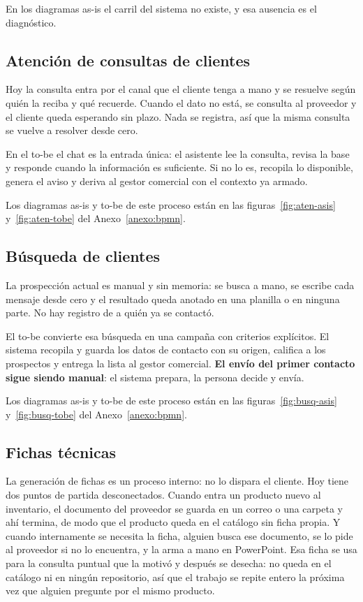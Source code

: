 \documentclass{article}
\begin{document}
En los diagramas as-is el carril del sistema no existe, y esa ausencia es el diagnóstico.

\subsection{Atención de consultas de clientes}

Hoy la consulta entra por el canal que el cliente tenga a mano y se resuelve según quién la reciba y qué recuerde. Cuando el dato no está, se consulta al proveedor y el cliente queda esperando sin plazo. Nada se registra, así que la misma consulta se vuelve a resolver desde cero.

En el to-be el chat es la entrada única: el asistente lee la consulta, revisa la base y responde cuando la información es suficiente. Si no lo es, recopila lo disponible, genera el aviso y deriva al gestor comercial con el contexto ya armado.

Los diagramas as-is y to-be de este proceso están en las figuras~\ref{fig:aten-asis} y~\ref{fig:aten-tobe} del Anexo~\ref{anexo:bpmn}.

\subsection{Búsqueda de clientes}

La prospección actual es manual y sin memoria: se busca a mano, se escribe cada mensaje desde cero y el resultado queda anotado en una planilla o en ninguna parte. No hay registro de a quién ya se contactó.

El to-be convierte esa búsqueda en una campaña con criterios explícitos. El sistema recopila y guarda los datos de contacto con su origen, califica a los prospectos y entrega la lista al gestor comercial. \textbf{El envío del primer contacto sigue siendo manual}: el sistema prepara, la persona decide y envía.

Los diagramas as-is y to-be de este proceso están en las figuras~\ref{fig:busq-asis} y~\ref{fig:busq-tobe} del Anexo~\ref{anexo:bpmn}.

\subsection{Fichas técnicas}

La generación de fichas es un proceso interno: no lo dispara el cliente. Hoy tiene dos puntos de partida desconectados. Cuando entra un producto nuevo al inventario, el documento del proveedor se guarda en un correo o una carpeta y ahí termina, de modo que el producto queda en el catálogo sin ficha propia. Y cuando internamente se necesita la ficha, alguien busca ese documento, se lo pide al proveedor si no lo encuentra, y la arma a mano en PowerPoint. Esa ficha se usa para la consulta puntual que la motivó y después se desecha: no queda en el catálogo ni en ningún repositorio, así que el trabajo se repite entero la próxima vez que alguien pregunte por el mismo producto.
\end{document}
